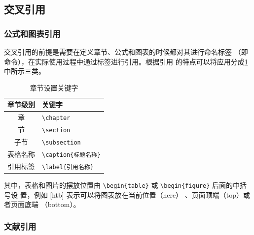 \subsection{交叉引用}

\subsubsection{公式和图表引用}

交叉引用的前提是需要在定义章节、公式和图表的时候都对其进行命名标签
（即\label{sec:labelName} 命令），在实际使用过程中通过标签进行引用。根据引用
的特点可以将应用分成\cref{tab:setSection} 中所示三类。

\begin{table}[htb]
 \centering
  \caption{章节设置关键字}     %
  \label{tab:setSection}    %
  \begin{tabular}{cl}
    \toprule
    章节级别        & 关键字     \\
    \midrule
     章        & \verb|\chapter| \\
     节        & \verb|\section | \\
    子节      & \verb|\subsection |\\
    表格名称       & \verb|\caption{标题名称}| \\
    引用标签       & \verb|\label{引用名称}| \\
    \bottomrule
  \end{tabular}
\end{table}


其中，表格和图片的摆放位置由 \verb|\begin{table}| 或 \verb|\begin{figure}| 后面的中括号设
置，例如 [htb] 表示可以将图表放在当前位置（here）
、页面顶端（top）或者页面底端
（bottom）。

\subsubsection{文献引用}


